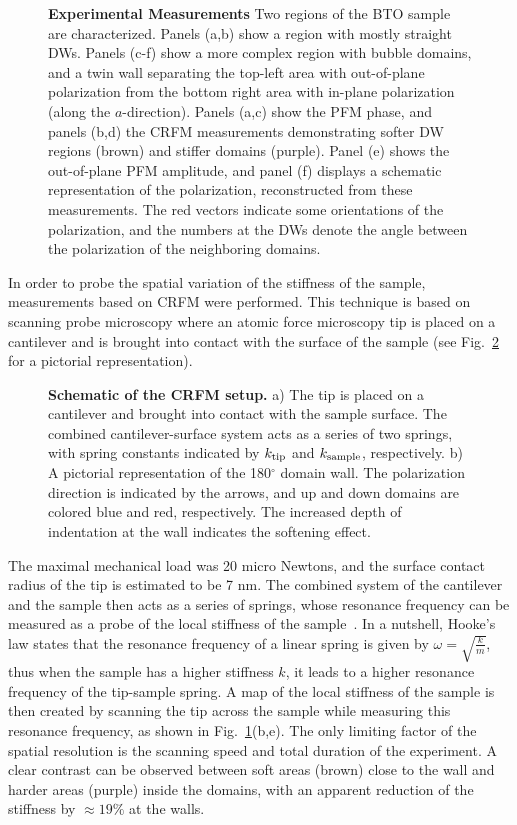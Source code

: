\begin{figure}
	\caption{\label{fig:BTO_experiment} {\bf Experimental Measurements} Two regions of the BTO sample are characterized. Panels (a,b) show a region with mostly straight \glspl{DW}. Panels (c-f) show a more complex region with bubble domains, and a twin wall separating the top-left area with out-of-plane polarization from the bottom right area with in-plane polarization (along the $a$-direction). Panels (a,c) show the \gls{PFM} phase, and panels (b,d) the \gls{CRFM} measurements demonstrating softer \gls{DW} regions (brown) and stiffer domains (purple). Panel (e) shows the out-of-plane \gls{PFM} amplitude, and panel (f) displays a schematic representation of the polarization, reconstructed from these measurements. The red vectors indicate some orientations of the polarization, and the numbers at the \glspl{DW} denote the angle between the polarization of the neighboring domains.}
\end{figure}

In order to probe the spatial variation of the stiffness of the sample, measurements based on \gls{CRFM} were performed.
This technique is based on scanning probe microscopy where an atomic force microscopy tip is placed on a cantilever and is brought into contact with the surface of the sample (see Fig.~\ref{fig:BTO_experimental_schematic} for a pictorial representation).
\begin{figure}
	\caption{\label{fig:BTO_experimental_schematic} {\bf Schematic of the \gls{CRFM} setup.} a) The tip is placed on a cantilever and brought into contact with the sample surface. The combined cantilever-surface system acts as a series of two springs, with spring constants indicated by $k_{\rm tip}$ and $k_{\rm sample}$, respectively. b) A pictorial representation of the 180$^\circ$ domain wall. The polarization direction is indicated by the arrows, and up and down domains are colored blue and red, respectively. The increased depth of indentation at the wall indicates the softening effect.}
\end{figure}
The maximal mechanical load was 20 micro Newtons, and the surface contact radius of the tip is estimated to be 7 nm.
The combined system of the cantilever and the sample then acts as a series of springs, whose resonance frequency can be measured as a probe of the local stiffness of the sample~\cite{Rabe2000}.
In a nutshell, Hooke's law states that the resonance frequency of a linear spring is given by $\omega = \sqrt{\frac{k}{m}}$, thus when the sample has a higher stiffness $k$, it leads to a higher resonance frequency of the tip-sample spring.
A map of the local stiffness of the sample is then created by scanning the tip across the sample while measuring this resonance frequency, as shown in Fig.~\ref{fig:BTO_experiment}(b,e).
The only limiting factor of the spatial resolution is the scanning speed and total duration of the experiment.  
A clear contrast can be observed between soft areas (brown) close to the wall and harder areas (purple) inside the domains, with an apparent reduction of the stiffness by $\approx 19\%$ at the walls.


